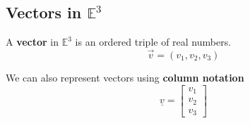 \subsection{Vectors in $\mathbb{E}^3$}
\begin{definition}
  A \textbf{vector} in $\mathbb{E}^3$ is an ordered triple of real numbers.\\
  \vspace{-10px}
  \begin{equation}
    \vec{v} = (v_1,v_2,v_3)
  \end{equation}
\end{definition}

\begin{notation}
  We can also represent vectors using {\bf column notation}
  $$\underline{v} = \begin{bmatrix} v_1 \\ v_2 \\ v_3\end{bmatrix} $$
  
\end{notation}

